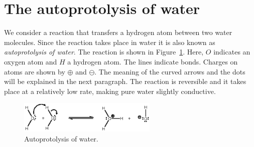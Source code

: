 \documentclass[runningheads]{llncs}
\begin{document}
\section{The autoprotolysis of water}

We consider a reaction that transfers a hydrogen atom between two water molecules. Since the
reaction takes place in water it is also known as \emph{autoprotolysis of water}. The reaction is shown 
in Figure~\ref{fig:autoprotolysis}. Here, $O$ indicates an oxygen atom and $H$ a hydrogen atom. The lines indicate bonds. Charges on atoms are shown by $\oplus$ and $\ominus$. The meaning of the curved arrows and the dots will be explained in the next paragraph. The reaction is reversible and it takes place at a relatively 
low rate, making pure water slightly conductive.

\begin{figure}
\centering
\includegraphics[height=1.5cm]{autoprotolysis_corr3}
\caption{Autoprotolysis of water.}
\label{fig:autoprotolysis}
\end{figure}
\end{document}
